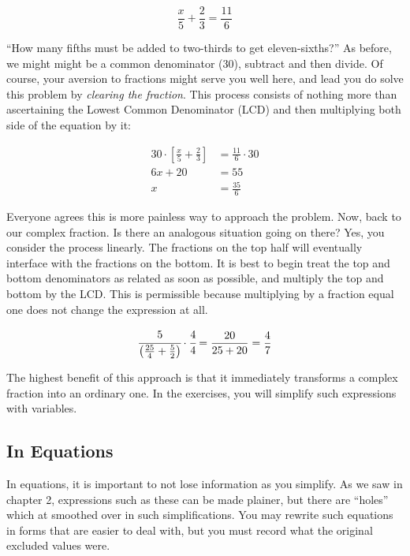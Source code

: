 \begin{equation}
\frac{x}{5}+\frac{2}{3}=\frac{11}{6}
\end{equation}

``How many fifths must be added to two-thirds to get eleven-sixths?''  As before, we might might
be a common denominator (30), subtract and then divide.  Of course, your aversion to fractions
might serve you well here, and lead you do solve this problem by \emph{clearing the fraction}.
This process consists of nothing more than ascertaining the Lowest Common Denominator (LCD)
and then multiplying both side of the equation by it:

\begin{align*}
30\cdot\left[\frac{x}{5}+\frac{2}{3}\right] &= \frac{11}{6}\cdot30\\
6x+20 &= 55\\
x &=\frac{35}{6}
\end{align*}

Everyone agrees this is more painless way to approach the problem.  Now, back to our
complex fraction.  Is there an analogous situation going on there?  Yes, you consider the
process linearly.  The fractions on the top half will eventually interface with the fractions on 
the bottom.  It is best to begin treat the top and bottom denominators as related as soon
as possible, and multiply the top and bottom by the LCD.  This is permissible because 
multiplying by a fraction equal one does not change the expression at all.

$$\cfrac{5}{\left(\frac{25}{4}+\frac{5}{2}\right)}\cdot\cfrac{4}{4}=\frac{20}{25+20}=\frac{4}{7}$$

The highest benefit of this approach is that it immediately transforms a complex fraction 
into an ordinary one.  In the exercises, you will simplify such expressions with variables.



\subsection{In Equations}
In equations, it is important to not lose information as you simplify.  As we saw in chapter 2,
expressions such as these can be made plainer, but there are ``holes'' which at smoothed 
over in such simplifications.  You may rewrite such equations in forms that are easier to
deal with, but you must record what the original excluded values were.

